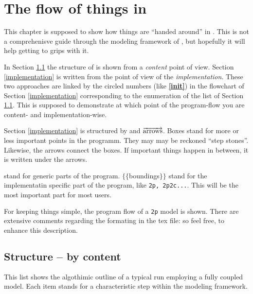 
\newcommand{\nextline}{\par\phantom{a}\vspace*{0.1\textwidth}}
\chapter{The flow of things in \Dumux}

This chapter is supposed to show how things are ``handed around'' in \Dumux. This is not a comprehenisve guide through the modeling framework of \Dumux, but hopefully it will help getting to grips with it. 

In Section \ref{content} the structure of \Dumux is shown from a \emph{content} point of view.
Section \ref{implementation} is written from the point of view of the \emph{implementation}. These two approaches are linked by the circled numbers (like \textbf{\textcircled{\ref{init}}}) in the flowchart of Section \ref{implementation} corresponding to the enumeration of the list of Section \ref{content}. This is supposed to demonstrate at which point of the program-flow you are content- and implementation-wise. 

Section \ref{implementation} is structured by  and $\overrightarrow{\textnormal{arrows}}$. Boxes stand for more or less important points in the programm. They may may be reckoned ``step stones''. Likewise, the arrows connect the boxes. If important things happen in between, it is written under the arrows.

 stand for generic parts of the program.  $\lbrace\lbrace$boundings$\rbrace\rbrace$ stand for the implementatin specific part of the program, like \verb+2p, 2p2c...+. This will be the most important part for most users. 

For keeping things simple, the program flow of a \verb+2p+ model is shown.
There are extensive comments regarding the formating in the tex file: so feel free, to enhance this description.

\section{Structure -- by content}
\label{content}
This list shows the algothimic outline of a typical \Dumux run employing a fully coupled model. Each item stands for a characteristic step within the modeling framework. 

